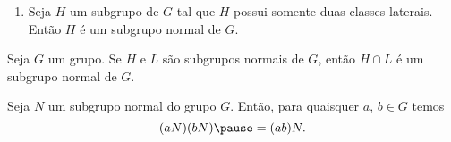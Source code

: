 \documentclass{beamer}
\begin{document}
    \begin{frame}
        \begin{exemplos}
            \begin{enumerate}[label=({\arabic*})]
                \conti

                \item Seja $H$ um subgrupo de $G$ \pause tal que $H$ possui somente duas classes laterais. \pause Então $H$ é um subgrupo normal de $G$.
                
                \seti
            \end{enumerate}
        \end{exemplos}
    \end{frame}

    \begin{frame}
        \begin{proposicao}
            Seja $G$ um grupo. \pause Se $H$ e $L$ são subgrupos normais de $G$, \pause então $H \cap L$ \pause é um subgrupo normal de $G$.
        \end{proposicao}
    \end{frame}

    \begin{frame}
        \begin{proposicao}
            Seja $N$ um subgrupo normal \pause do grupo $G$. \pause Então, para quaisquer $a$, $b \in G$ temos \pause
            \[
                (aN)(bN) \pause = (ab)N.
            \]
        \end{proposicao}
    \end{frame}
\end{document}
